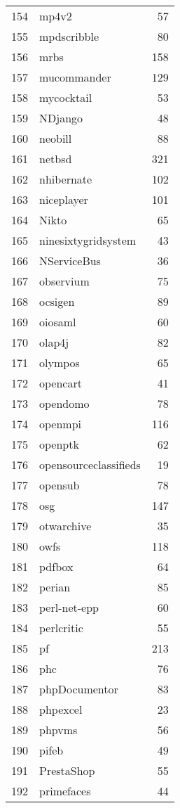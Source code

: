 \begin{table}[!ht]
\begin{tabular}{rlr}
  154 & mp4v2 &  57 \\ 
  155 & mpdscribble &  80 \\ 
  156 & mrbs & 158 \\ 
  157 & mucommander & 129 \\ 
  158 & mycocktail &  53 \\ 
  159 & NDjango &  48 \\ 
  160 & neobill &  88 \\ 
  161 & netbsd & 321 \\ 
  162 & nhibernate & 102 \\ 
  163 & niceplayer & 101 \\ 
  164 & Nikto &  65 \\ 
  165 & ninesixtygridsystem &  43 \\ 
  166 & NServiceBus &  36 \\ 
  167 & observium &  75 \\ 
  168 & ocsigen &  89 \\ 
  169 & oiosaml &  60 \\ 
  170 & olap4j &  82 \\ 
  171 & olympos &  65 \\ 
  172 & opencart &  41 \\ 
  173 & opendomo &  78 \\ 
  174 & openmpi & 116 \\ 
  175 & openptk &  62 \\ 
  176 & opensourceclassifieds &  19 \\ 
  177 & opensub &  78 \\ 
  178 & osg & 147 \\ 
  179 & otwarchive &  35 \\ 
  180 & owfs & 118 \\ 
  181 & pdfbox &  64 \\ 
  182 & perian &  85 \\ 
  183 & perl-net-epp &  60 \\ 
  184 & perlcritic &  55 \\ 
  185 & pf & 213 \\ 
  186 & phc &  76 \\ 
  187 & phpDocumentor &  83 \\ 
  188 & phpexcel &  23 \\ 
  189 & phpvms &  56 \\ 
  190 & pifeb &  49 \\ 
  191 & PrestaShop &  55 \\ 
  192 & primefaces &  44 \\ 

\end{tabular}
\end{table}
